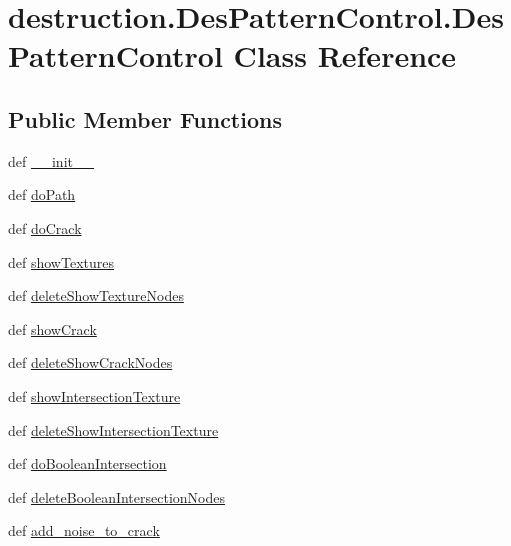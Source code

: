 \hypertarget{classdestruction_1_1_des_pattern_control_1_1_des_pattern_control}{\section{destruction.\-Des\-Pattern\-Control.\-Des\-Pattern\-Control Class Reference}
\label{classdestruction_1_1_des_pattern_control_1_1_des_pattern_control}
}
\subsection*{Public Member Functions}
\begin{DoxyCompactItemize}
\item 
def \hyperlink{classdestruction_1_1_des_pattern_control_1_1_des_pattern_control_aeba4ddca67c216227bea84cdfc5c37a9}{\-\_\-\-\_\-init\-\_\-\-\_\-}
\item 
def \hyperlink{classdestruction_1_1_des_pattern_control_1_1_des_pattern_control_a51091de68d0b0b56003e23433a914669}{do\-Path}
\item 
def \hyperlink{classdestruction_1_1_des_pattern_control_1_1_des_pattern_control_a2679f5c7ae717f6db8abe9e3c5fc3e83}{do\-Crack}
\item 
def \hyperlink{classdestruction_1_1_des_pattern_control_1_1_des_pattern_control_ae9023ad957a442010a6611a9c4b934c1}{show\-Textures}
\item 
def \hyperlink{classdestruction_1_1_des_pattern_control_1_1_des_pattern_control_af001719aa990c8273623ccacae2fbaa4}{delete\-Show\-Texture\-Nodes}
\item 
def \hyperlink{classdestruction_1_1_des_pattern_control_1_1_des_pattern_control_aae2ab8988b9399b1f0d6cb6c929eb1ac}{show\-Crack}
\item 
def \hyperlink{classdestruction_1_1_des_pattern_control_1_1_des_pattern_control_ace89a08d2cdf16adf7b40512e6f78bde}{delete\-Show\-Crack\-Nodes}
\item 
def \hyperlink{classdestruction_1_1_des_pattern_control_1_1_des_pattern_control_a18fd8d42685f717edfba74e058116991}{show\-Intersection\-Texture}
\item 
def \hyperlink{classdestruction_1_1_des_pattern_control_1_1_des_pattern_control_a6aa59bac1fd99675f9327f2f22819447}{delete\-Show\-Intersection\-Texture}
\item 
def \hyperlink{classdestruction_1_1_des_pattern_control_1_1_des_pattern_control_a15ca60be8029581c85f91845d03d6f92}{do\-Boolean\-Intersection}
\item 
def \hyperlink{classdestruction_1_1_des_pattern_control_1_1_des_pattern_control_a1c678a9c9384cccdffcce3b5665d8885}{delete\-Boolean\-Intersection\-Nodes}
\item 
def \hyperlink{classdestruction_1_1_des_pattern_control_1_1_des_pattern_control_ae68da0ee4a23dbb289a72625f7e99a7d}{add\-\_\-noise\-\_\-to\-\_\-crack}
\end{DoxyCompactItemize}
